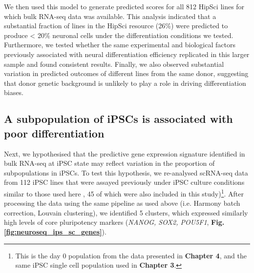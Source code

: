 We then used this model to generate predicted scores for all 812 HipSci lines for which bulk RNA-seq data was available.
This analysis indicated that a substantial fraction of lines in the HipSci resource (26\%) were predicted to produce < 20\% neuronal cells under the differentiation conditions we tested.
Furthermore, we tested whether the same experimental and biological factors previously associated with neural differentiation efficiency replicated in this larger sample and found consistent results.
Finally, we also observed substantial variation in predicted outcomes of different lines from the same donor, suggesting that donor genetic background is unlikely to play a role in driving differentiation biases.

\newpage

\subsection{A subpopulation of iPSCs is associated with poor differentiation}

Next, 
we hypothesised that the predictive gene expression signature identified in bulk RNA-seq at iPSC state may reflect variation in the proportion of subpopulations in iPSCs. 
To test this hypothesis, we re-analysed scRNA-seq data from 112 iPSC lines that were assayed previously under iPSC culture conditions similar to those used here
\cite{cuomo2020single}, 45 of which were also included in this study)\footnote{This is the day 0 population from the data presented in \textbf{Chapter 4}, and the same iPSC single cell population used in \textbf{Chapter 3}.}. 
After processing the data using the same pipeline as used above (i.e. Harmony batch correction, Louvain clustering),
we identified 5 clusters, 
which expressed similarly high levels of core pluripotency markers (\textit{NANOG, SOX2, POU5F1}, \textbf{Fig. \ref{fig:neuroseq_ips_sc_genes}}). \\

